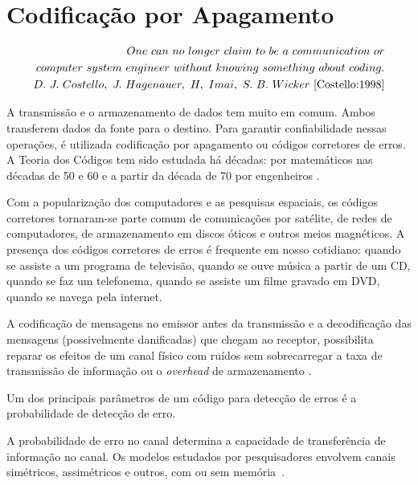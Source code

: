 \chapter{Codificação por Apagamento}

{\small
\begin{align*}
One\ can\ no\ longer\ claim\ to\ be\ a\ communication\ or\\
computer\ system\ engineer\ without\ knowing\ something\ about\ coding.\\
D.\ J.\ Costello,\ J.\ Hagenauer,\ H,\ Imai,\ S.\ B.\ Wicker~\cite{Costello:1998}
\end{align*}
}

A transmissão e o armazenamento de dados tem muito em comum. Ambos transferem dados da fonte para o destino. Para garantir confiabilidade nessas operações, é utilizada codificação por apagamento ou códigos corretores de erros. A Teoria dos Códigos tem sido estudada há décadas: por matemáticos nas décadas de 50 e 60 e a partir da década de 70 por engenheiros \cite{Ritter:2009, Hefez:2008}.

Com a popularização dos computadores e as pesquisas espaciais, os códigos corretores tornaram-se parte comum de comunicações por satélite, de redes de computadores, de armazenamento em discos óticos e outros meios magnéticos. A presença dos códigos corretores de erros é frequente em nosso cotidiano: quando se assiste a um programa de televisão, quando se ouve música a partir de um CD, quando se faz um telefonema, quando se assiste um filme gravado em DVD, quando se navega pela internet.

A codificação de mensagens no emissor antes da transmissão e a
decodificação das mensagens (possivelmente danificadas) que chegam ao
receptor, possibilita reparar os efeitos de um canal físico com ruídos
\cite{Shannon:1948} sem sobrecarregar a taxa de transmissão de
informação ou o \emph{overhead} de armazenamento \cite{Lin:1983}.


Um dos principais parâmetros de um código para detecção de erros é a
probabilidade de detecção de erro.

 A probabilidade de erro no canal determina a capacidade de
 transferência de informação no canal. Os modelos estudados por
 pesquisadores envolvem canais simétricos, assimétricos e outros, com
 ou sem memória~\cite{Weber:1985}. 

